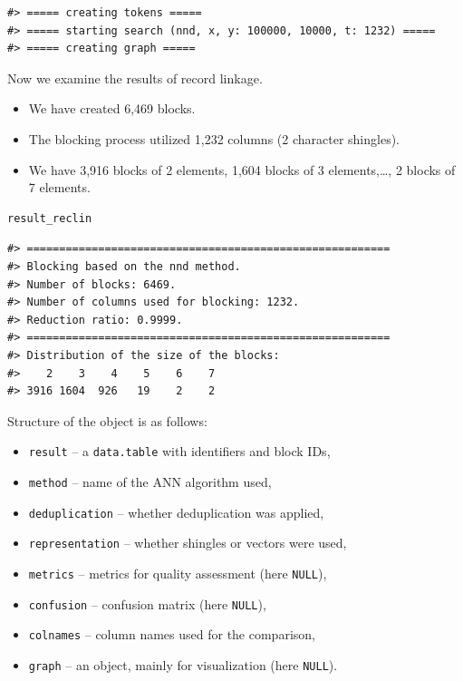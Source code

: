 \begin{verbatim}
#> ===== creating tokens =====
#> ===== starting search (nnd, x, y: 100000, 10000, t: 1232) =====
#> ===== creating graph =====
\end{verbatim}

Now we examine the results of record linkage.

\begin{itemize}
\tightlist
\item
  We have created 6,469 blocks.
\item
  The blocking process utilized 1,232 columns (2 character shingles).
\item
  We have 3,916 blocks of 2 elements, 1,604 blocks of 3 elements,\ldots, 2 blocks of 7 elements.
\end{itemize}

\begin{verbatim}
result_reclin
\end{verbatim}

\begin{verbatim}
#> ========================================================
#> Blocking based on the nnd method.
#> Number of blocks: 6469.
#> Number of columns used for blocking: 1232.
#> Reduction ratio: 0.9999.
#> ========================================================
#> Distribution of the size of the blocks:
#>    2    3    4    5    6    7 
#> 3916 1604  926   19    2    2
\end{verbatim}

Structure of the object is as follows:

\begin{itemize}
\tightlist
\item
  \texttt{result} -- a \texttt{data.table} with identifiers and block IDs,
\item
  \texttt{method} -- name of the ANN algorithm used,
\item
  \texttt{deduplication} -- whether deduplication was applied,
\item
  \texttt{representation} -- whether shingles or vectors were used,
\item
  \texttt{metrics} -- metrics for quality assessment (here \texttt{NULL}),
\item
  \texttt{confusion} -- confusion matrix (here \texttt{NULL}),
\item
  \texttt{colnames} -- column names used for the comparison,
\item
  \texttt{graph} -- an  object, mainly for visualization (here \texttt{NULL}).
\end{itemize}

